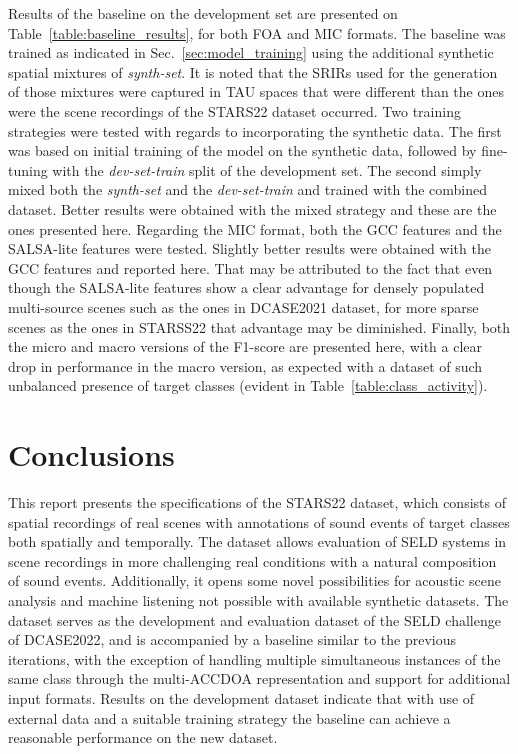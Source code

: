 \documentclass{article}
\begin{document}
\begin{sloppy}
Results of the baseline on the development set are presented on Table~\ref{table:baseline_results}, for both FOA and MIC formats. The baseline was trained as indicated in Sec.~\ref{sec:model_training} using the additional synthetic spatial mixtures of \emph{synth-set}. It is noted that the SRIRs used for the generation of those mixtures were captured in TAU spaces that were different than the ones were the scene recordings of the STARS22 dataset occurred. Two training strategies were tested with regards to incorporating the synthetic data. The first was based on initial training of the model on the synthetic data, followed by fine-tuning with the \emph{dev-set-train} split of the development set. The second simply mixed both the \emph{synth-set} and the \emph{dev-set-train} and trained with the combined dataset. Better results were obtained with the mixed strategy and these are the ones presented here. Regarding the MIC format, both the GCC features and the SALSA-lite features were tested. Slightly better results were obtained with the GCC features and reported here. That may be attributed to the fact that even though the SALSA-lite features show a clear advantage for densely populated multi-source scenes \cite{nguyen2022salsa} such as the ones in DCASE2021 dataset, for more sparse scenes as the ones in STARSS22 that advantage may be diminished. Finally, both the micro and macro versions of the F1-score are presented here, with a clear drop in performance in the macro version, as expected with a dataset of such unbalanced presence of target classes (evident in Table~\ref{table:class_activity}).








\section{Conclusions}
\label{sec:conclusions}

This report presents the specifications of the STARS22 dataset, which consists of spatial recordings of real scenes with annotations of sound events of target classes both spatially and temporally. The dataset allows evaluation of SELD systems in scene recordings in more challenging real conditions with a natural composition of sound events. Additionally, it opens some novel possibilities for acoustic scene analysis and machine listening not possible with available synthetic datasets. The dataset serves as the development and evaluation dataset of the SELD challenge of DCASE2022, and is accompanied by a baseline similar to the previous iterations, with the exception of handling multiple simultaneous instances of the same class through the multi-ACCDOA representation and support for additional input formats. Results on the development dataset indicate that with use of external data and a suitable training strategy the baseline can achieve a reasonable performance on the new dataset.


\end{sloppy}
\end{document}
